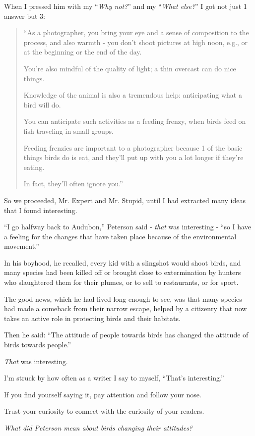 \documentclass{book}
\numberwithin{equation}{section}
\begin{document}
When I pressed him with my ``\textit{Why not?}'' and my ``\textit{What else?}'' I got not just 1 answer but 3:
\begin{quotation}
    ``As a photographer, you bring your eye and a sense of composition to the process, and also warmth - you don't shoot pictures at high noon, e.g., or at the beginning or the end of the day.
    
    You're also mindful of the quality of light; a thin overcast can do nice things.
    
    Knowledge of the animal is also a tremendous help: anticipating what a bird will do.
    
    You can anticipate such activities as a feeding frenzy, when birds feed on fish traveling in small groups.
    
    Feeding frenzies are important to a photographer because 1 of the basic things birds do is eat, and they'll put up with you a lot longer if they're eating.
    
    In fact, they'll often ignore you.''
\end{quotation}
So we proceeded, Mr. Expert and Mr. Stupid, until I had extracted many ideas that I found interesting.

``I go halfway back to Audubon,'' Peterson said - \textit{that} was interesting - ``so I have a feeling for the changes that have taken place because of the environmental movement.''

In his boyhood, he recalled, every kid with a slingshot would shoot birds, and many species had been killed off or brought close to extermination by hunters who slaughtered them for their plumes, or to sell to restaurants, or for sport.

The good news, which he had lived long enough to see, was that many species had made a comeback from their narrow escape, helped by a citizenry that now takes an active role in protecting birds and their habitats.

Then he said: ``The attitude of people towards birds has changed the attitude of birds towards people.''

%
\textit{That} was interesting.

I'm struck by how often as a writer I say to myself, ``That's interesting.''

If you find yourself saying it, pay attention and follow your nose.

Trust your curiosity to connect with the curiosity of your readers.

%
\textit{What did Peterson mean about birds changing their attitudes?}
\end{document}
